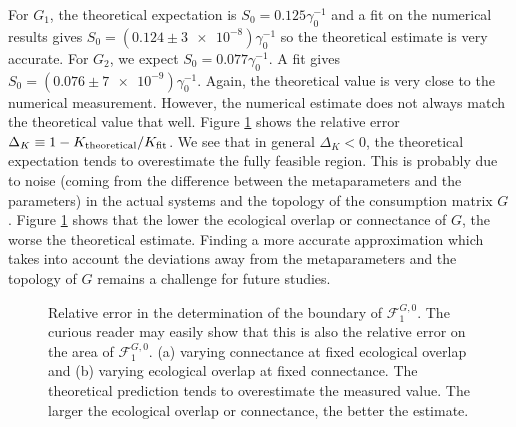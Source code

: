 \documentclass[12pt, titlepage]{report}
\begin{document}
 For $G_1$, the theoretical expectation is $S_0 = 0.125 \gamma_0^{-1}$ and a fit on the numerical results gives $S_0=(\num[scientific-notation=false]{0.124}\pm\num{3e-8}) \gamma_0^{-1}$ so the theoretical estimate is very accurate.
For $G_2$, we expect $S_0 = 0.077 \gamma_0^{-1}$. A fit gives $S_0=(\num[scientific-notation=false]{0.076}\pm\num{7e-9})\gamma_0^{-1}$. Again, the theoretical value is very close to the numerical measurement.
However, the numerical estimate does not always match the theoretical value that well. Figure \ref{fig: deviation away from theory feasibility} shows the relative error $\Delta_K \equiv 1 - K_\text{theoretical}/K_\text{fit}$. We see that in general $\Delta_K < 0$, \ie the theoretical expectation tends to overestimate the fully feasible region. This is probably due to noise (\ie coming from the difference between the metaparameters and the parameters) in the actual systems and the topology of the consumption matrix $G$. Figure \ref{fig: deviation away from theory feasibility} shows that the lower the ecological overlap or connectance of $G$, the worse the theoretical estimate. Finding a more accurate approximation which takes into account the deviations away from the metaparameters and the topology of $G$ remains a challenge for future studies.

\begin{figure}[h!]
	\captionsetup[subfigure]{captionskip = -175pt, margin = 45pt}
\captionsetup[subfigure]{captionskip = -175pt, margin = 45pt}
\caption{Relative error in the determination of the boundary of $\mathcal{F}^{G,0}_1$. The curious reader may easily show that this is also the relative error on the area of $\mathcal{F}^{G,0}_1$. (a) varying connectance at fixed ecological overlap and (b) varying ecological overlap at fixed connectance. The theoretical prediction tends to overestimate the measured value. The larger the ecological overlap or connectance, the better the estimate.}\label{fig: deviation away from theory feasibility}
\end{figure}
\end{document}
